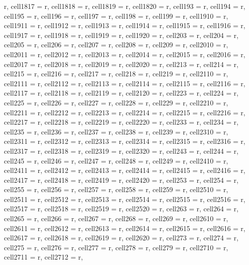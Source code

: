 \documentclass[journal]{IEEEtran}
\begin{document}
\begin{table}
\begin{adjustbox}{width=\textwidth}
\begin{tblr}
{{r},  cell{18}{17} = {r},  cell{18}{18} = {r},  cell{18}{19} = {r},  cell{18}{20} = {r},  cell{19}{3} = {r},  cell{19}{4} = {r},  cell{19}{5} = {r},  cell{19}{6} = {r},  cell{19}{7} = {r},  cell{19}{8} = {r},  cell{19}{9} = {r},  cell{19}{10} = {r},  cell{19}{11} = {r},  cell{19}{12} = {r},  cell{19}{13} = {r},  cell{19}{14} = {r},  cell{19}{15} = {r},  cell{19}{16} = {r},  cell{19}{17} = {r},  cell{19}{18} = {r},  cell{19}{19} = {r},  cell{19}{20} = {r},  cell{20}{3} = {r},  cell{20}{4} = {r},  cell{20}{5} = {r},  cell{20}{6} = {r},  cell{20}{7} = {r},  cell{20}{8} = {r},  cell{20}{9} = {r},  cell{20}{10} = {r},  cell{20}{11} = {r},  cell{20}{12} = {r},  cell{20}{13} = {r},  cell{20}{14} = {r},  cell{20}{15} = {r},  cell{20}{16} = {r},  cell{20}{17} = {r},  cell{20}{18} = {r},  cell{20}{19} = {r},  cell{20}{20} = {r},  cell{21}{3} = {r},  cell{21}{4} = {r},  cell{21}{5} = {r},  cell{21}{6} = {r},  cell{21}{7} = {r},  cell{21}{8} = {r},  cell{21}{9} = {r},  cell{21}{10} = {r},  cell{21}{11} = {r},  cell{21}{12} = {r},  cell{21}{13} = {r},  cell{21}{14} = {r},  cell{21}{15} = {r},  cell{21}{16} = {r},  cell{21}{17} = {r},  cell{21}{18} = {r},  cell{21}{19} = {r},  cell{21}{20} = {r},  cell{22}{3} = {r},  cell{22}{4} = {r},  cell{22}{5} = {r},  cell{22}{6} = {r},  cell{22}{7} = {r},  cell{22}{8} = {r},  cell{22}{9} = {r},  cell{22}{10} = {r},  cell{22}{11} = {r},  cell{22}{12} = {r},  cell{22}{13} = {r},  cell{22}{14} = {r},  cell{22}{15} = {r},  cell{22}{16} = {r},  cell{22}{17} = {r},  cell{22}{18} = {r},  cell{22}{19} = {r},  cell{22}{20} = {r},  cell{23}{3} = {r},  cell{23}{4} = {r},  cell{23}{5} = {r},  cell{23}{6} = {r},  cell{23}{7} = {r},  cell{23}{8} = {r},  cell{23}{9} = {r},  cell{23}{10} = {r},  cell{23}{11} = {r},  cell{23}{12} = {r},  cell{23}{13} = {r},  cell{23}{14} = {r},  cell{23}{15} = {r},  cell{23}{16} = {r},  cell{23}{17} = {r},  cell{23}{18} = {r},  cell{23}{19} = {r},  cell{23}{20} = {r},  cell{24}{3} = {r},  cell{24}{4} = {r},  cell{24}{5} = {r},  cell{24}{6} = {r},  cell{24}{7} = {r},  cell{24}{8} = {r},  cell{24}{9} = {r},  cell{24}{10} = {r},  cell{24}{11} = {r},  cell{24}{12} = {r},  cell{24}{13} = {r},  cell{24}{14} = {r},  cell{24}{15} = {r},  cell{24}{16} = {r},  cell{24}{17} = {r},  cell{24}{18} = {r},  cell{24}{19} = {r},  cell{24}{20} = {r},  cell{25}{3} = {r},  cell{25}{4} = {r},  cell{25}{5} = {r},  cell{25}{6} = {r},  cell{25}{7} = {r},  cell{25}{8} = {r},  cell{25}{9} = {r},  cell{25}{10} = {r},  cell{25}{11} = {r},  cell{25}{12} = {r},  cell{25}{13} = {r},  cell{25}{14} = {r},  cell{25}{15} = {r},  cell{25}{16} = {r},  cell{25}{17} = {r},  cell{25}{18} = {r},  cell{25}{19} = {r},  cell{25}{20} = {r},  cell{26}{3} = {r},  cell{26}{4} = {r},  cell{26}{5} = {r},  cell{26}{6} = {r},  cell{26}{7} = {r},  cell{26}{8} = {r},  cell{26}{9} = {r},  cell{26}{10} = {r},  cell{26}{11} = {r},  cell{26}{12} = {r},  cell{26}{13} = {r},  cell{26}{14} = {r},  cell{26}{15} = {r},  cell{26}{16} = {r},  cell{26}{17} = {r},  cell{26}{18} = {r},  cell{26}{19} = {r},  cell{26}{20} = {r},  cell{27}{3} = {r},  cell{27}{4} = {r},  cell{27}{5} = {r},  cell{27}{6} = {r},  cell{27}{7} = {r},  cell{27}{8} = {r},  cell{27}{9} = {r},  cell{27}{10} = {r},  cell{27}{11} = {r},  cell{27}{12} = {r},  }
\end{tblr}
\end{adjustbox}
\end{table}
\end{document}
